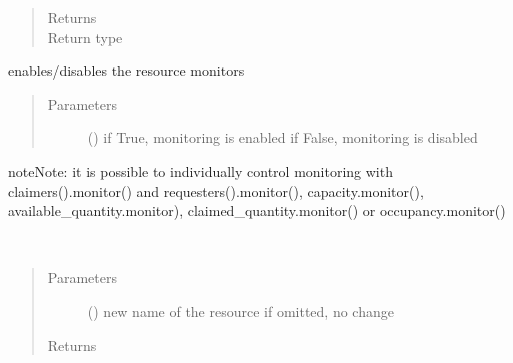 \documentclass[letterpaper,10pt,english]{sphinxmanual}
\begin{document}
\begin{fulllineitems}
\begin{fulllineitems}
\begin{quote}
\begin{description}
\item[{Returns}] \leavevmode
{}

\item[{Return type}] \leavevmode
{\hyperref[\detokenize{Reference:salabim.Resource}]{}}

\end{description}\end{quote}

\end{fulllineitems}


\begin{fulllineitems}
\label{\detokenize{Reference:salabim.Resource.monitor}}
enables/disables the resource monitors
\begin{quote}\begin{description}
\item[{Parameters}] \leavevmode
{} () \textendash{} if True, monitoring is enabled 
if False, monitoring is disabled 

\end{description}\end{quote}

\begin{sphinxadmonition}{note}{Note:}
it is possible to individually control monitoring with claimers().monitor()
and requesters().monitor(), capacity.monitor(), available\_quantity.monitor),
claimed\_quantity.monitor() or occupancy.monitor()
\end{sphinxadmonition}

\end{fulllineitems}


\begin{fulllineitems}
\label{\detokenize{Reference:salabim.Resource.name}}~\begin{quote}\begin{description}
\item[{Parameters}] \leavevmode
{} () \textendash{} new name of the resource
if omitted, no change

\item[{Returns}] \leavevmode
{}


\end{description}
\end{quote}
\end{fulllineitems}
\end{fulllineitems}
\end{document}
